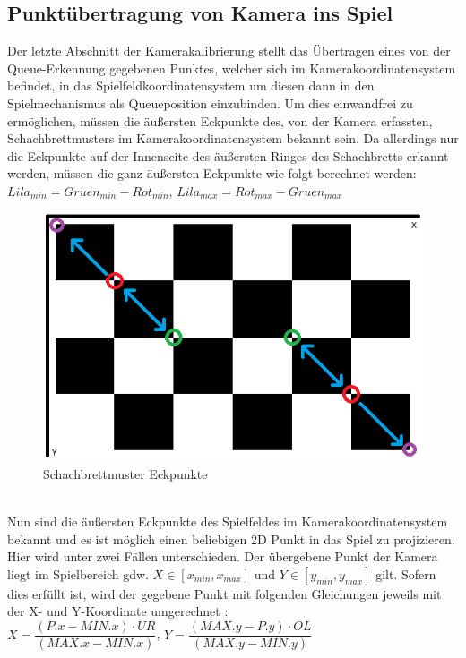 \subsection{Punktübertragung von Kamera ins Spiel}
Der letzte Abschnitt der Kamerakalibrierung stellt das Übertragen eines von der Queue-Erkennung gegebenen Punktes, welcher sich im Kamerakoordinatensystem befindet, in das Spielfeldkoordinatensystem um diesen dann in den Spielmechanismus als Queueposition einzubinden.
Um dies einwandfrei zu ermöglichen, müssen die äußersten Eckpunkte des, von der Kamera erfassten, Schachbrettmusters im Kamerakoordinatensystem bekannt sein. Da allerdings nur die Eckpunkte auf der Innenseite des äußersten Ringes des Schachbretts erkannt werden, müssen die ganz äußersten Eckpunkte wie folgt berechnet werden:\\
$Lila_{min} = Gruen_{min} - Rot_{min}$, 
$Lila_{max} = Rot_{max} - Gruen_{max}$
\begin{figure}[h]
	\centering
	\includegraphics[scale=0.5]{bilder/schachbrettdiff.png}
	\caption{Schachbrettmuster Eckpunkte}
\end{figure}\\
Nun sind die äußersten Eckpunkte des Spielfeldes im Kamerakoordinatensystem bekannt und es ist möglich einen beliebigen 2D Punkt in das Spiel zu projizieren. Hier wird unter zwei Fällen unterschieden. Der übergebene Punkt der Kamera liegt im Spielbereich gdw. $X \in [x_{min}, x_{max}]$ und $Y \in [y_{min},y_{max}]$ gilt.
Sofern dies erfüllt ist, wird der gegebene Punkt mit folgenden Gleichungen jeweils mit der X- und Y-Koordinate umgerechnet :\\
$X = \dfrac{(P.x - MIN.x) \cdot UR}{(MAX.x - MIN.x)}$, 
$Y = \dfrac{(MAX.y - P.y) \cdot OL}{(MAX.y - MIN.y)}$
